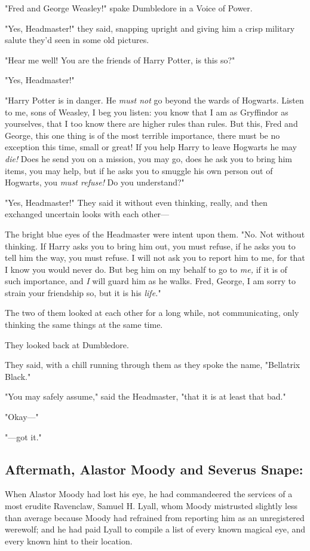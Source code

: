 "Fred and George Weasley!" spake Dumbledore in a Voice of Power.

"Yes, Headmaster!" they said, snapping upright and giving him a crisp military 
salute they'd seen in some old pictures.

"Hear me well! You are the friends of Harry Potter, is this so?"

"Yes, Headmaster!"

"Harry Potter is in danger. He \emph{must not} go beyond the wards of Hogwarts. 
Listen to me, sons of Weasley, I beg you listen: you know that I am as 
Gryffindor as yourselves, that I too know there are higher rules than rules. 
But this, Fred and George, this one thing is of the most terrible importance, 
there must be no exception this time, small or great! If you help Harry to 
leave Hogwarts he may \emph{die!} Does he send you on a mission, you may go, 
does he ask you to bring him items, you may help, but if he asks you to smuggle 
his own person out of Hogwarts, you \emph{must refuse!} Do you understand?"

"Yes, Headmaster!" They said it without even thinking, really, and then 
exchanged uncertain looks with each other---

The bright blue eyes of the Headmaster were intent upon them. "No. Not without 
thinking. If Harry asks you to bring him out, you must refuse, if he asks you 
to tell him the way, you must refuse. I will not ask you to report him to me, 
for that I know you would never do. But beg him on my behalf to go to 
\emph{me,} if it is of such importance, and \emph{I} will guard him as he 
walks. Fred, George, I am sorry to strain your friendship so, but it is his 
\emph{life.}"

The two of them looked at each other for a long while, not communicating, only 
thinking the same things at the same time.

They looked back at Dumbledore.

They said, with a chill running through them as they spoke the name, "Bellatrix 
Black."

"You may safely assume," said the Headmaster, "that it is at least that bad."

"Okay---"

"---got it."
\sbreak
\subsection{Aftermath, Alastor Moody and Severus Snape:}

When Alastor Moody had lost his eye, he had commandeered the services of a most 
erudite Ravenclaw, Samuel H. Lyall, whom Moody mistrusted slightly less than 
average because Moody had refrained from reporting him as an unregistered 
werewolf; and he had paid Lyall to compile a list of every known magical eye, 
and every known hint to their location.

